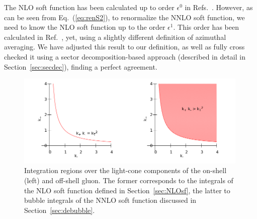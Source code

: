 \documentclass[a4paper,11pt]{article}
\numberwithin{equation}{section}
\begin{document}
The NLO soft function has been calculated up to order $\epsilon^0$ in
Refs.~\cite{Li:2013mia, Catani:2014qha}. However, as can be seen from
Eq.~(\ref{eq:renS2}), to renormalize the NNLO soft function, we need to
know the NLO soft function up to the order $\epsilon^1$. This order has been
calculated in Ref.~\cite{AntoniaMTh}, yet, using a slightly different definition
of azimuthal averaging. We have adjusted this result to our definition, as well
as fully cross checked it using a sector decomposition-based approach (described
in detail in Section~\ref{sec:secdec}), finding a perfect agreement.

\begin{figure}[t]
  \begin{center}
    \includegraphics[width=0.99\textwidth]{plots/light-cone-phase-space.png}
  \end{center}
  \caption{
  Integration regions over the light-cone components of the on-shell (left) and
  off-shell gluon. The former corresponds to the integrals of the NLO soft
  function defined in Section~\ref{sec:NLOsf}, the latter to bubble integrals of
  the NNLO soft function discussed in Section~\ref{sec:debubble}.
  }
  \label{fig:light-cone-phase-space}
\end{figure}
\end{document}

